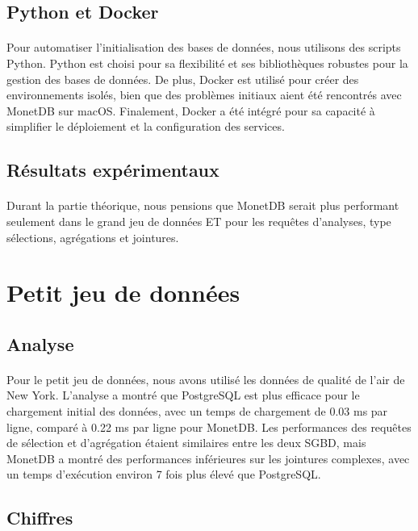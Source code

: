 \documentclass[11pt]{extarticle}
\begin{document}
\subsection{Python et Docker}
\paragraph{}
Pour automatiser l'initialisation des bases de données, nous utilisons des scripts Python. Python est choisi pour sa flexibilité et ses bibliothèques robustes pour la gestion des bases de données. De plus, Docker est utilisé pour créer des environnements isolés, bien que des problèmes initiaux aient été rencontrés avec MonetDB sur macOS. Finalement, Docker a été intégré pour sa capacité à simplifier le déploiement et la configuration des services.

\subsection{Résultats expérimentaux}
\paragraph{}
Durant la partie théorique, nous pensions que MonetDB serait plus performant seulement dans le grand jeu de données ET pour les requêtes d'analyses, type sélections, agrégations et jointures.

\section{Petit jeu de données}
\subsection{Analyse}
\paragraph{}
Pour le petit jeu de données, nous avons utilisé les données de qualité de l'air de New York. L'analyse a montré que PostgreSQL est plus efficace pour le chargement initial des données, avec un temps de chargement de 0.03 ms par ligne, comparé à 0.22 ms par ligne pour MonetDB. Les performances des requêtes de sélection et d'agrégation étaient similaires entre les deux SGBD, mais MonetDB a montré des performances inférieures sur les jointures complexes, avec un temps d'exécution environ 7 fois plus élevé que PostgreSQL.

\subsection{Chiffres}
\end{document}
